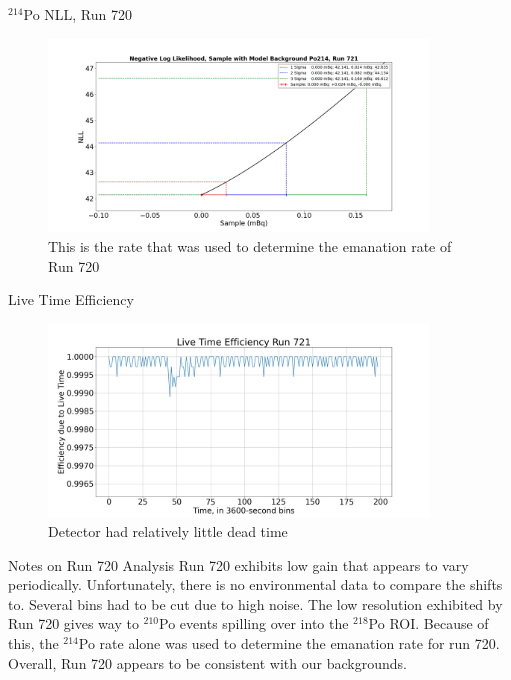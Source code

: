 \documentclass[aspectratio=169]{beamer}
\begin{document}
\begin{frame}{$^{214}$Po NLL, Run 720}
    \begin{figure}
        \begin{center}
            \includegraphics[width=0.9\textwidth]
            {assets/720/NLL214.png}
            \caption{This is the rate that was used to determine the emanation rate of Run 720}
        \end{center}
    \end{figure}
\end{frame}

\begin{frame}{Live Time Efficiency}
    \begin{figure}
        \begin{center}
            \includegraphics[width=0.9\textwidth]
            {assets/720/LTE.png}
            \caption{Detector had relatively little dead time}
        \end{center}
    \end{figure}
\end{frame}

\begin{frame}{Notes on Run 720 Analysis}
    Run 720 exhibits low gain that appears to vary periodically.
    Unfortunately, there is no environmental data to compare the shifts to.
    Several bins had to be cut due to high noise.
    The low resolution exhibited by Run 720 gives way to $^{210}$Po events spilling over
    into the $^{218}$Po ROI.
    Because of this, the $^{214}$Po rate alone was used to determine the emanation rate
    for run 720.
    Overall, Run 720 appears to be consistent with our backgrounds.

    \hyperlink{RvT_720}{}
\end{frame}
\end{document}

